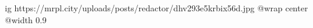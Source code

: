  
 
 
 
 

\ifcmt
  ig https://mrpl.city/uploads/posts/redactor/dhv293e5krbix56d.jpg
  @wrap center
  @width 0.9
\fi
